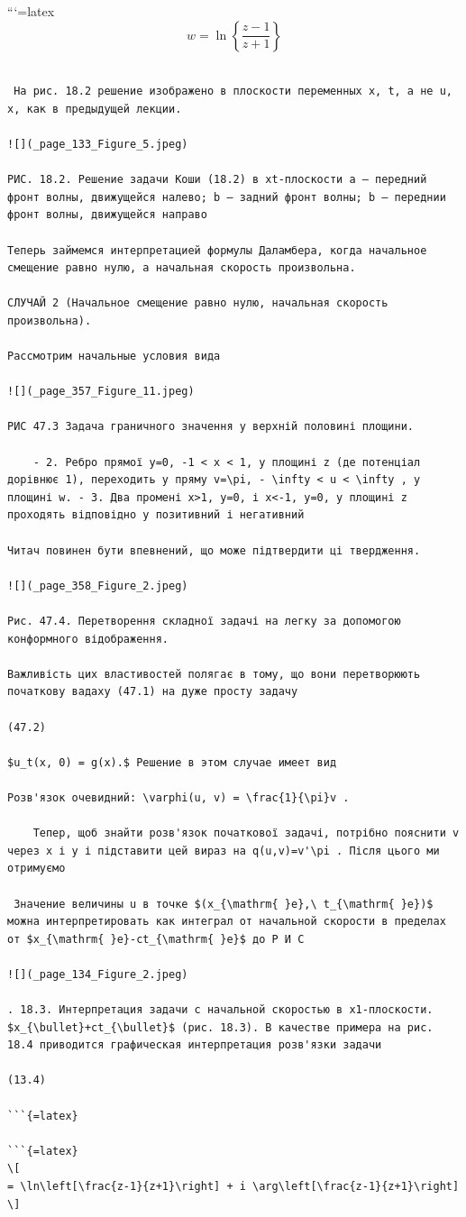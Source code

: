 \documentclass[
  ukrainian,
]{article}
\begin{document}
```{=latex}
\[
w = \ln\left\{\frac{z-1}{z+1}\right\}
\]

\begin{verbatim}

 На рис. 18.2 решение изображено в плоскости переменных x, t, а не u, x, как в предыдущей лекции.

![](_page_133_Figure_5.jpeg)

РИС. 18.2. Решение задачи Коши (18.2) в xt-плоскости a — передний фронт волны, движущейся налево; b — задний фронт волны; b — переднии фронт волны, движущейся направо

Теперь займемся интерпретацией формулы Даламбера, когда начальное смещение равно нулю, а начальная скорость произвольна.

СЛУЧАЙ 2 (Начальное смещение равно нулю, начальная скорость произвольна).

Рассмотрим начальные условия вида

![](_page_357_Figure_11.jpeg)

РИС 47.3 Задача граничного значення у верхній половині площини.

    - 2. Ребро прямої y=0, -1 < x < 1, у площині z (де потенціал дорівнює 1), переходить у пряму v=\pi, - \infty < u < \infty , у площині w. - 3. Два промені x>1, y=0, і x<-1, y=0, у площині z проходять відповідно у позитивний і негативний

Читач повинен бути впевнений, що може підтвердити ці твердження.

![](_page_358_Figure_2.jpeg)

Рис. 47.4. Перетворення складної задачі на легку за допомогою конформного відображення.

Важливість цих властивостей полягає в тому, що вони перетворюють початкову вадаху (47.1) на дуже просту задачу

(47.2)

$u_t(x, 0) = g(x).$ Решение в этом случае имеет вид

Розв'язок очевидний: \varphi(u, v) = \frac{1}{\pi}v .

    Тепер, щоб знайти розв'язок початкової задачі, потрібно пояснити v через x і y і підставити цей вираз на q(u,v)=v'\pi . Після цього ми отримуємо

 Значение величины u в точке $(x_{\mathrm{ }e},\ t_{\mathrm{ }e})$ можна интерпретировать как интеграл от начальной скорости в пределах от $x_{\mathrm{ }e}-ct_{\mathrm{ }e}$ до Р И С

![](_page_134_Figure_2.jpeg)

. 18.3. Интерпретация задачи с начальной скоростью в x1-плоскости. $x_{\bullet}+ct_{\bullet}$ (рис. 18.3). В качестве примера на рис. 18.4 приводится графическая интерпретация розв'язки задачи

(13.4)

```{=latex}

```{=latex}
\[
= \ln\left[\frac{z-1}{z+1}\right] + i \arg\left[\frac{z-1}{z+1}\right]
\]
\end{verbatim}
\end{document}
